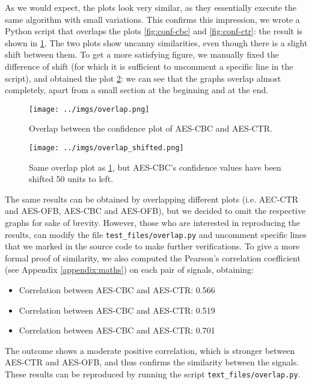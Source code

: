 \documentclass[12pt,a4paper]{book}
\theoremstyle{definition}
\begin{document}
	As we would expect, the plots look very similar, as they essentially execute the same algorithm with small variations.
	This confirms this impression, we wrote a Python script that overlaps the plots \ref{fig:conf-cbc} and \ref{fig:conf-ctr}: the result is shown in \ref{fig:overlap}. The two plots show uncanny similarities, even though there is a slight shift between them. To get a more satisfying figure, we manually fixed the difference of shift (for which it is sufficient to uncomment a specific line in the script), and obtained the plot \ref{fig:overlap-shifted}: we can see that the graphs overlap almost completely, apart from a small section at the beginning and at the end.
	
	\begin{figure}
		\hspace*{-1.5cm}
		\texttt{[image: ../imgs/overlap.png]}
		\caption{Overlap between the confidence plot of AES-CBC and AES-CTR.}
		\label{fig:overlap}
	\end{figure}
	
	\begin{figure}
		\hspace*{-1.5cm}
		\texttt{[image: ../imgs/overlap\_shifted.png]}
		\caption{Same overlap plot as \ref{fig:overlap}, but AES-CBC's confidence values have been shifted 50 units to left.}
		\label{fig:overlap-shifted}
	\end{figure}
	
	The same results can be obtained by overlapping different plots (i.e. AEC-CTR and AES-OFB, AES-CBC and AES-OFB), but we decided to omit the respective graphs for sake of brevity. However, those who are interested in reproducing the results, can modify the file \texttt{test\_files/overlap.py} and uncomment specific lines that we marked in the source code to make further verifications. To give a more formal proof of similarity, we also computed the Pearson's correlation coefficient (see Appendix \ref{appendix:maths}) on each pair of signals, obtaining:
	\begin{itemize}
		\item Correlation between AES-CBC and AES-CTR: 0.566
		\item Correlation between AES-CBC and AES-CTR: 0.519
		\item Correlation between AES-CBC and AES-CTR: 0.701
	\end{itemize}
	The outcome shows a moderate positive correlation, which is stronger between AES-CTR and AES-OFB, and thus confirms the similarity between the signals. These results can be reproduced by running the script \texttt{text\_files/overlap.py}.
	
\end{document}
